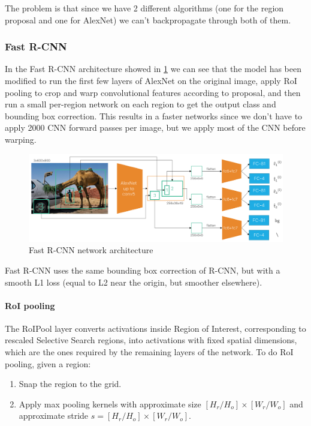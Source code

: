 The problem is that since we have 2 different algorithms (one for the region proposal and one for AlexNet) we can't backpropagate through both of them.

\subsubsection{Fast R-CNN}

In the Fast R-CNN architecture showed in \ref{fig:fastrcnn} we can see that the model has been modified to run the first few layers of AlexNet on the original image, apply RoI pooling to crop and warp convolutional features according to proposal, and then run a small per-region network on each region to get the output class and bounding box correction.
This results in a faster networks since we don't have to apply 2000 CNN forward passes per image, but we apply most of the CNN before warping.

\begin{figure}[htbp]
  \centering
  \includegraphics[width=0.8\linewidth]{./img/fastrcnn.png}
  \caption{Fast R-CNN network architecture}
  \label{fig:fastrcnn}
\end{figure}

Fast R-CNN uses the same bounding box correction of R-CNN, but with a smooth L1 loss (equal to L2 near the origin, but smoother elsewhere).

\paragraph{RoI pooling}
The RoIPool layer converts activations inside Region of Interest, corresponding to rescaled Selective Search regions, into activations with fixed spatial dimensions, which are the ones required by the remaining layers of the network.
To do RoI pooling, given a region:
\begin{enumerate}
  \item Snap the region to the grid.
  \item Apply max pooling kernels with approximate size $[H_r/H_o]\times [W_r/W_o]$ and approximate stride $s = [H_r/H_o]\times[W_r/W_o]$.
\end{enumerate}

